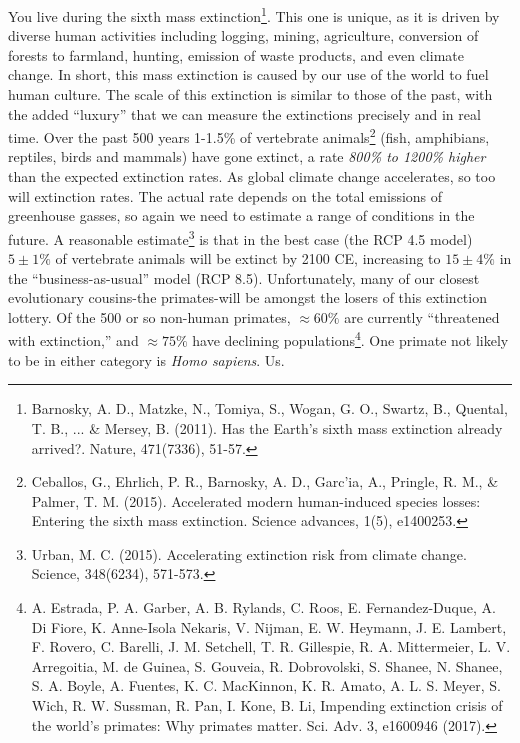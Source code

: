 You live during the sixth mass extinction\footnote{Barnosky, A. D., Matzke, N., Tomiya, S., Wogan, G. O., Swartz, B., Quental, T. B., ... \& Mersey, B. (2011). Has the Earth's sixth mass extinction already arrived?. Nature, 471(7336), 51-57.}. This one is unique, as it is driven by diverse human activities including logging, mining, agriculture, conversion of forests to farmland, hunting, emission of waste products, and even climate change. In short, this mass extinction is caused by our use of the world to fuel human culture. The scale of this extinction is similar to those of the past, with the added ``luxury'' that we can measure the extinctions precisely and in real time. Over the past 500 years 1-1.5\% of vertebrate animals\footnote{Ceballos, G., Ehrlich, P. R., Barnosky, A. D., Garc'ia, A., Pringle, R. M., \& Palmer, T. M. (2015). Accelerated modern human-induced species losses: Entering the sixth mass extinction. Science advances, 1(5), e1400253.} (fish, amphibians, reptiles, birds and mammals) have gone extinct, a rate \emph{800\% to 1200\% higher} than the expected extinction rates. As global climate change accelerates, so too will extinction rates. The actual rate depends on the total emissions of greenhouse gasses, so again we need to estimate a range of conditions in the future. A reasonable estimate\footnote{Urban, M. C. (2015). Accelerating extinction risk from climate change. Science, 348(6234), 571-573.} is that in the best case (the RCP 4.5 model) $5 \pm 1\%$ of vertebrate animals will be extinct by 2100 CE, increasing to $15 \pm 4\%$ in the ``business-as-usual'' model (RCP 8.5). Unfortunately, many of our closest evolutionary cousins-the primates-will be amongst the losers of this extinction lottery. Of the 500 or so non-human primates, $\approx 60\%$ are currently ``threatened with extinction,'' and $\approx 75\%$ have declining populations\footnote{A. Estrada, P. A. Garber, A. B. Rylands, C. Roos, E. Fernandez-Duque, A. Di Fiore,
K. Anne-Isola Nekaris, V. Nijman, E. W. Heymann, J. E. Lambert, F. Rovero, C. Barelli,
J. M. Setchell, T. R. Gillespie, R. A. Mittermeier, L. V. Arregoitia, M. de Guinea, S. Gouveia,
R. Dobrovolski, S. Shanee, N. Shanee, S. A. Boyle, A. Fuentes, K. C. MacKinnon, K. R. Amato,
A. L. S. Meyer, S. Wich, R. W. Sussman, R. Pan, I. Kone, B. Li, Impending extinction crisis of
the world's primates: Why primates matter. Sci. Adv. 3, e1600946 (2017).}. One primate not likely to be in either category is \textit{Homo sapiens}. Us.\\
  
